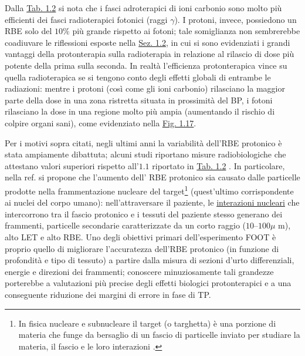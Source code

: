 \documentclass[12pt,a4paper,twoside]{report}
\begin{document}
	Dalla \hyperref[tab:let_rbe]{Tab. 1.2} si nota che i fasci adroterapici di ioni carbonio sono molto più efficienti dei fasci radioterapici fotonici (raggi $\gamma$). I protoni, invece, possiedono un RBE solo del $10\%$ più grande rispetto ai fotoni; tale somiglianza non sembrerebbe coadiuvare le riflessioni esposte nella \hyperref[sec:1.2]{Sez. 1.2}, in cui si sono evidenziati i grandi vantaggi della protonterapia sulla radioterapia in relazione al rilascio di dose più potente della prima sulla seconda. In realtà l'efficienza protonterapica vince su quella radioterapica se si tengono conto degli effetti globali di entrambe le radiazioni: mentre i protoni (così come gli ioni carbonio) rilasciano la maggior parte della dose in una zona ristretta situata in prossimità del BP, i fotoni rilasciano la dose in una regione molto più ampia (aumentando il rischio di colpire organi sani), come evidenziato nella \hyperref[fig:photon]{Fig. 1.17}.
	
	Per i motivi sopra citati, negli ultimi anni la variabilità dell'RBE protonico è stata ampiamente dibattuta; alcuni studi riportano misure radiobiologiche che attestano valori superiori rispetto all'$1.1$ riportato in \hyperref[tab:let_rbe]{Tab. 1.2} \cite{Tang1997-wb}. In particolare, nella ref. \cite{cancers7010353} si propone che l'aumento dell' RBE protonico sia causato dalle particelle prodotte nella frammentazione nucleare del target\footnote{In fisica nucleare e subnucleare il target (o targhetta) è una porzione di materia che funge da bersaglio di un fascio di particelle inviato per studiare la materia, il fascio e le loro interazioni \cite{treccani_target}.} (quest'ultimo corrispondente ai nuclei del corpo umano): nell'attraversare il paziente, le \hyperref[par:interazioni_nucleari]{interazioni nucleari} che intercorrono tra il fascio protonico e i tessuti del paziente stesso generano dei frammenti, particelle secondarie caratterizzate da un corto raggio ($10$--$100\mu\mbox{ m}$), alto LET e alto RBE. Uno degli obiettivi primari dell'esperimento FOOT è proprio quello di migliorare l'accuratezza dell'RBE protonico (in funzione di profondità e tipo di tessuto) a partire dalla misura di sezioni d'urto differenziali, energie e direzioni dei frammenti; conoscere minuziosamente tali grandezze porterebbe a valutazioni più precise degli effetti biologici protonterapici e a una conseguente riduzione dei margini di errore in fase di TP.
		
\end{document}
